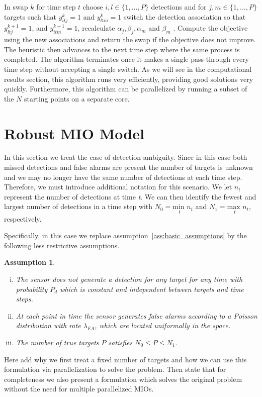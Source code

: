 \documentclass[journal]{IEEEtran}
\newtheorem{assumption}{Assumption}
\begin{document}
In swap $k$ for time step $t$ choose $i,l\in \{1,\ldots,P\}$ detections and for $j,m\in\{1,\ldots,P\}$ targets such that $y^k_{itj}=1$ and $y^k_{ltm}=1$ switch the detection association so that $y^{k+1}_{ltj}=1$, and $y^{k+1}_{itm}=1$, recalculate $\alpha_j, \beta_j, \alpha_m$ and $\beta_m$ . Compute the objective using the new associations and return the swap if the objective does not improve. The heuristic then advances to the next time step where the same process is completed. The algorithm terminates once it makes a single pass through every time step without accepting a single switch. As we will see in the computational results section, this algorithm runs very efficiently, providing good solutions very quickly. Furthermore, this algorithm can be parallelized by running a subset of the $N$ starting points on a separate core.

\section{Robust MIO Model}
{\color{red}
In this section we treat the case of detection ambiguity. Since in this case both missed detections and false alarms are present the number of targets is unknown and we may no longer have the same number of detections at each time step. Therefore, we must introduce additional notation for this scenario. We let $n_{t}$ represent  the number of detections at time \textit{t}. We can then identify the fewest and largest number of detections in a time step with $N_{0} = \underset{t}{\text{min }} n_{t}$ and $N_{1} = \underset{t}{\text{max }}  n_{t}$, respectively. 

Specifically, in this case we replace assumption~\ref{ass:basic_assumptions} by the following less restrictive assumptions.
\begin{assumption}\label{ass:robust_assumptions}
\begin{enumerate}[(i)]
\item The sensor does not generate a detection for any target for any time with probability $P_{d}$ which is constant and independent between targets and time steps.
\item At each point in time the sensor generates false alarms according to a Poisson distribution with rate $\lambda_{FA}$, which are located uniformally in the space.
\item The number of true targets $P$ satisfies $N_0\leq P \leq N_1$.
\end{enumerate}
\end{assumption}


Here add why we first treat a fixed number of targets and how we can use this formulation via parallelization to solve the problem. Then state that for completeness we also present a formulation which solves the original problem without the need for multiple parallelized MIOs.
}
\end{document}
